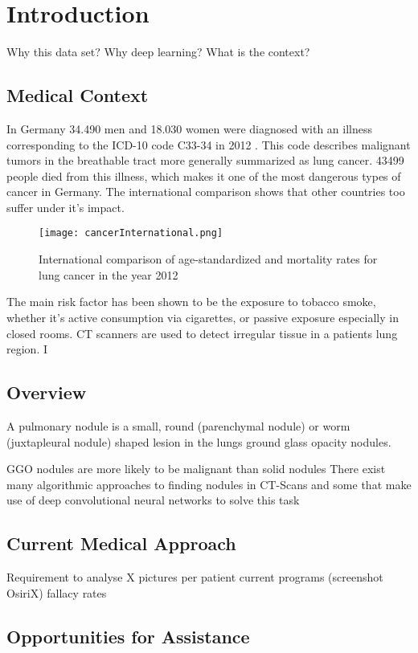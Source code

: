 \documentclass[main.tex]{subfiles}
\begin{document}
\chapter{Introduction}
Why this data set?
Why deep learning?
What is the context?

\section{Medical Context}
In Germany 34.490 men and 18.030 women were diagnosed with an illness corresponding to the ICD-10 code C33-34 in 2012 \cite{koch2015krebs}. This code describes malignant tumors in the breathable tract more generally summarized as lung cancer. 43499 people died from this illness, which makes it one of the most dangerous types of cancer in Germany. The international comparison shows that other countries too suffer under it's impact.

\begin{figure}[h]
\texttt{[image: cancerInternational.png]}
\caption{International comparison of age-standardized and mortality rates for lung cancer in the year 2012}
\end{figure}

The main risk factor has been shown to be the exposure to tobacco smoke, whether it's active consumption via cigarettes, or passive exposure especially in closed rooms. CT scanners are used to detect irregular tissue in a patients lung region. I

\section{Overview}


 A pulmonary nodule is a small, round (parenchymal nodule) or worm (juxtapleural nodule) shaped lesion in the lungs
 ground glass opacity nodules.
 
 GGO nodules are more likely to be malignant than solid nodules
There exist many algorithmic approaches to finding nodules in CT-Scans \cite{papers_classical} and some that
make use of deep convolutional neural networks to solve this task \cite{papers_dnn}

\section{Current Medical Approach}
Requirement to analyse X pictures per patient
current programs (screenshot OsiriX)
fallacy rates

\section{Opportunities for Assistance}
\end{document}
